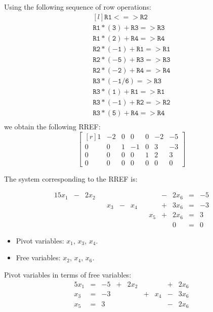 \documentclass[12pt]{article}
\begin{document}
Using the following sequence of row operations:
\[
\begin{matrix*}[l]
\mathtt{R1<=>R2}\\
\mathtt{R1*(3)+R3=>R3}\\
\mathtt{R1*(2)+R4=>R4}\\
\mathtt{R2*(-1)+R1=>R1}\\
\mathtt{R2*(-5)+R3=>R3}\\
\mathtt{R2*(-2)+R4=>R4}\\
\mathtt{R3*(-1/6)=>R3}\\
\mathtt{R3*(1)+R1=>R1}\\
\mathtt{R3*(-1)+R2=>R2}\\
\mathtt{R3*(5)+R4=>R4}\\
\end{matrix*}
\]
we obtain the following RREF:
\[
\left[\begin{matrix*}[r]1 & -2 & 0 & 0 & 0 & -2 & -5\\0 & 0 & 1 & -1 & 0 & 3 & -3\\0 & 0 & 0 & 0 & 1 & 2 & 3\\0 & 0 & 0 & 0 & 0 & 0 & 0\end{matrix*}\right]
\]

The system corresponding to the RREF is:

\begin{alignat*}{15}
x_1 &{}-{}& 2x_2 &{}{}&        &{}{}&        &{}{}&       &{}-{}& 2x_{6} &{}={}& -5\\ 
    &{}{}&       &{}{}&  x_{3} &{}-{}& x_{4} &{}{}&       &{}+{}& 3x_{6} &{}={}& -3\\ 
    &{}{}&       &{}{}&        &{}{}&        &{}{}& x_{5} &{}+{}& 2x_{6} &{}={}&  3\\ 
    &{}{}&       &{}{}&        &{}{}&        &{}{}&       &{}{}&       0 &{}={}&  0 
\end{alignat*}

\begin{itemize}
\item Pivot variables: $x_1$, $x_3$, $x_4$.
\item Free variables: $x_2$, $x_4$, $x_6$.
\end{itemize}

Pivot variables in terms of free variables:
\begin{alignat*}{5}
x_1 &{}={}& -5 &{}+{}& 2x_2 &{}{}&      &{}+{}& 2x_6\\
x_3 &{}={}& -3 &{}{}&       &{}+{}& x_4 &{}-{}& 3x_6\\
x_5 &{}={}&  3 &{}{}&       &{}{}&      &{}-{}& 2x_6
\end{alignat*}
\end{document}
